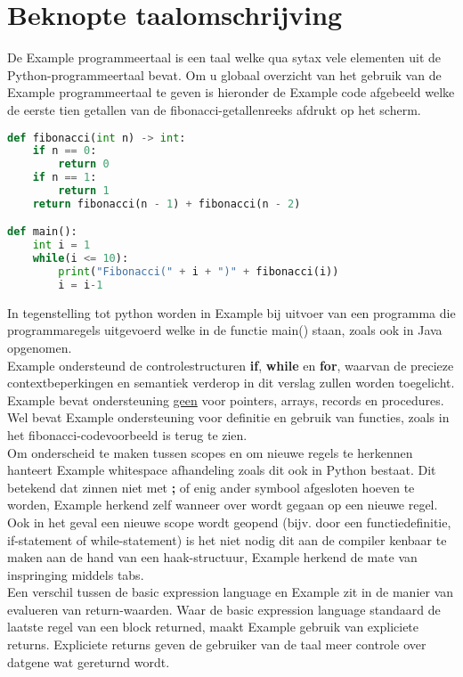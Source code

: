 \section{Beknopte taalomschrijving}
De Example programmeertaal is een taal welke qua sytax vele elementen uit de Python-programmeertaal bevat. Om u globaal overzicht van het gebruik van de Example programmeertaal te geven is hieronder de Example code afgebeeld welke de eerste tien getallen van de fibonacci-getallenreeks afdrukt op het scherm.
\begin{lstlisting}[language=Python]
def fibonacci(int n) -> int:
	if n == 0:
		return 0
	if n == 1:
		return 1
	return fibonacci(n - 1) + fibonacci(n - 2)

def main():
	int i = 1
	while(i <= 10):
		print("Fibonacci(" + i + ")" + fibonacci(i))
		i = i-1

\end{lstlisting}

In tegenstelling tot python worden in Example bij uitvoer van een programma die programmaregels uitgevoerd welke in de functie main() staan, zoals ook in Java opgenomen.\\

Example ondersteund de controlestructuren \textbf{if}, \textbf{while} en \textbf{for}, waarvan de precieze contextbeperkingen en semantiek verderop in dit verslag zullen worden toegelicht. Example bevat ondersteuning \underline{geen} voor pointers, arrays, records en procedures. Wel bevat Example ondersteuning voor definitie en gebruik van functies, zoals in het fibonacci-codevoorbeeld is terug te zien.\\

Om onderscheid te maken tussen scopes en om nieuwe regels te herkennen hanteert Example whitespace afhandeling zoals dit ook in Python bestaat. Dit betekend dat zinnen niet met \textbf{;} of enig ander symbool afgesloten hoeven te worden, Example herkend zelf wanneer over wordt gegaan op een nieuwe regel. Ook in het geval een nieuwe scope wordt geopend (bijv. door een functiedefinitie, if-statement of while-statement) is het niet nodig dit aan de compiler kenbaar te maken aan de hand van een haak-structuur, Example herkend de mate van inspringing middels tabs.\\

Een verschil tussen de basic expression language en Example zit in de manier van evalueren van return-waarden. Waar de basic expression language standaard de laatste regel van een block returned, maakt Example gebruik van expliciete returns. Expliciete returns geven de gebruiker van de taal meer controle over datgene wat gereturnd wordt.\\

